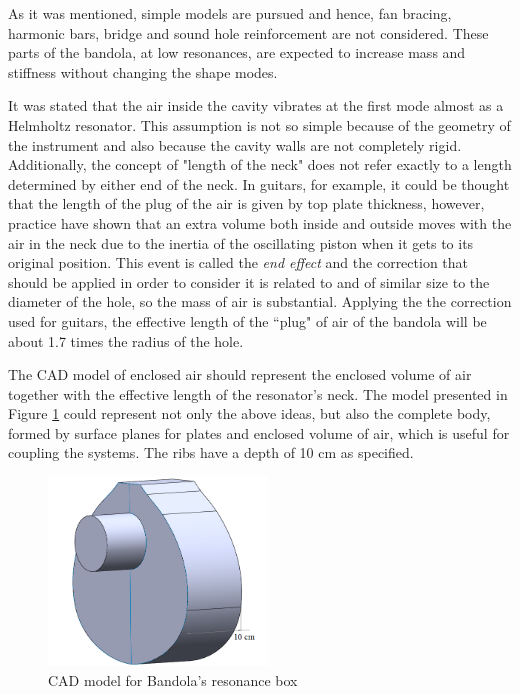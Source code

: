 As it was mentioned, simple models are pursued and hence, fan bracing, harmonic bars, bridge and sound hole reinforcement are not considered. These parts of the bandola, at low resonances, are expected to increase mass and stiffness without changing the shape modes.

It was stated that the air inside the cavity vibrates at the first mode almost as a Helmholtz resonator. This assumption is not so simple because of the geometry of the instrument and also because the cavity walls are not completely rigid. Additionally, the concept of "length of the neck" does not refer exactly to a length determined by either end of the neck. In guitars, for example, it could be thought that the length of the plug of the air is given by top plate thickness, however, practice have shown that an extra volume both inside and outside moves with the air in the neck due to the inertia of the oscillating piston when it gets to its original position. This event is called the \emph{end effect} and the correction that should be applied in order to consider it is related to and of similar size to the diameter of the hole, so the mass of air is substantial. Applying the the correction used for guitars, the effective length of the ``plug" of air of the bandola will be about 1.7 times the radius of the hole.

The CAD model of enclosed air should represent the enclosed volume of air together with the effective length of the resonator's neck. The model presented in Figure \ref{CADBody} could represent not only the above ideas, but also the complete body, formed by surface planes for plates and enclosed volume of air, which is useful for coupling the systems. The ribs have a depth of {10 cm} as specified.

\begin{figure}[h]
\centering
\includegraphics[height=5cm]{img/CADBody.png}
\caption{CAD model for Bandola's resonance box}
\label{CADBody}
\end{figure}

